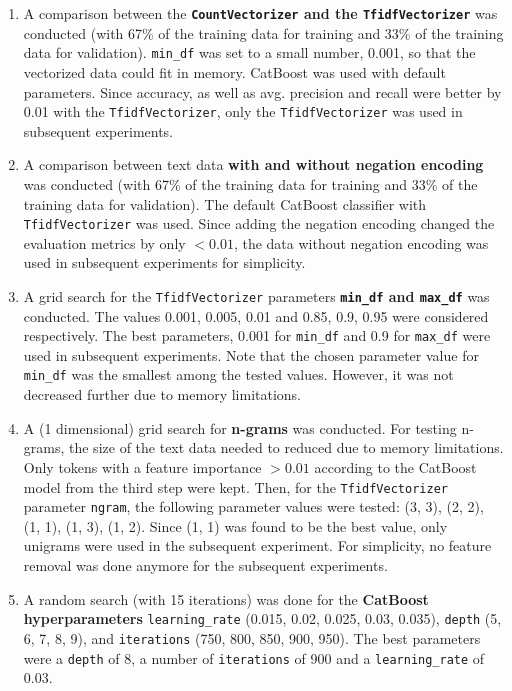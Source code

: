 \documentclass{article}
\begin{document}
	
	\begin{enumerate}
		\item 	A comparison between the \textbf{\lstinline{CountVectorizer} and the \lstinline{TfidfVectorizer}} was conducted (with 67\% of the training data for training and 33\% of the training data for validation). \lstinline{min_df} was set to a small number, 0.001, so that the vectorized data could fit in memory. CatBoost was used with default parameters. Since accuracy, as well as avg. precision and recall were better by 0.01 with the \lstinline{TfidfVectorizer}, only the \lstinline{TfidfVectorizer} was used in subsequent experiments.
		\item 	A comparison between text data \textbf{with and without negation encoding} was conducted (with 67\% of the training data for training and 33\% of the training data for validation). The default CatBoost classifier with \lstinline{TfidfVectorizer} was used. Since adding the negation encoding changed the evaluation metrics by only $<0.01$, the data without negation encoding was used in subsequent experiments for simplicity.
		\item 	A grid search for the \lstinline{TfidfVectorizer} parameters \textbf{\lstinline{min_df} and \lstinline{max_df}} was conducted. The values 0.001, 0.005, 0.01 and 0.85, 0.9, 0.95 were considered	respectively. The best parameters, 0.001 for \lstinline{min_df} and 0.9 for \lstinline{max_df} were used in subsequent experiments. Note that the chosen parameter value for \lstinline{min_df} was the smallest among the tested values. However, it was not decreased further due to memory limitations.
		\item 	A (1 dimensional) grid search for \textbf{n-grams} was conducted. For testing n-grams, the size of the text data needed to reduced due to memory limitations. Only tokens with a feature importance $>0.01$ according to the CatBoost model from the third step were kept. Then, for the \lstinline{TfidfVectorizer} parameter \lstinline{ngram}, the following parameter values were tested: (3, 3), (2, 2), (1, 1), (1, 3), (1, 2). Since (1, 1) was found to be the best value, only unigrams were used in the subsequent experiment. For simplicity, no feature removal was done anymore for the subsequent experiments.
		\item 	A random search (with 15 iterations) was done for the \textbf{CatBoost hyperparameters} \lstinline{learning_rate} (0.015, 0.02, 0.025, 0.03, 0.035), \lstinline{depth} (5, 6, 7, 8, 9), and \lstinline{iterations} (750, 800, 850, 900, 950). The best parameters were a \lstinline{depth} of 8, a number of \lstinline{iterations} of 900 and a \lstinline{learning_rate} of 0.03.
	\end{enumerate}
	
\end{document}
